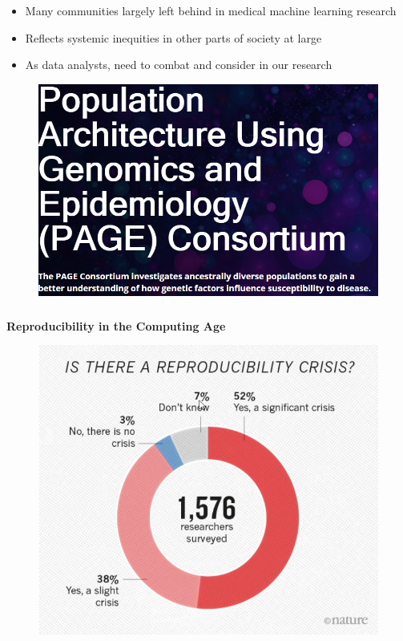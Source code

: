 \documentclass[xcolor=dvipsnames]{beamer}
\begin{document}
\begin{frame}
\frametitle{\insertsectionhead}
\begin{itemize}
\item Many communities largely left behind in medical machine learning research
\item Reflects systemic inequities in other parts of society at large
\item As data analysts, need to combat and consider in our research
\end{itemize}
\begin{figure}
\includegraphics[scale=0.4]{images/page_cons.png}
\end{figure}
\end{frame}

\begin{frame}
\frametitle{\insertsectionhead}
\textbf{Reproducibility in the Computing Age}
\begin{figure}
\includegraphics[scale=0.45]{images/reproducibility.png}
\end{figure}
\end{frame}
\end{document}
